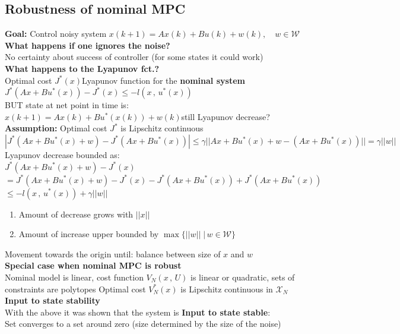 \subsection{Robustness of nominal MPC}
\textbf{Goal:} Control noisy system
$x(k+1)=Ax(k)+Bu(k)+w(k),\quad w\in\mathcal{W}$\\
\textbf{What happens if one ignores the noise?}\\
\rightarrow No certainty about success of controller (for some states it could work)\\
\textbf{What happens to the Lyapunov fct.?}\\
Optimal cost $J^*(x)$\rightarrow Lyapunov function for the \textbf{nominal system}\\
$J^*(Ax+Bu^*(x))-J^*(x)\leq-l(x\,,\,u^*(x))$\\
BUT state at net point in time is:\\
$x(k+1)=Ax(k)+Bu^*(x(k))+w(k)$\rightarrow still Lyapunov decrease?\\
\textbf{Assumption:} Optimal cost $J^*$ is Lipschitz continuous\\
$|J^*(Ax+Bu^*(x)+w)-J^*(Ax+Bu^*(x))|\leq\gamma||Ax+Bu^*(x)+w-(Ax+Bu^*(x))||=\gamma||w||$\\
Lyapunov decrease bounded as:\\
$J^*(Ax+Bu^*(x)+w)-J^*(x)$\\
$=J^*(Ax+Bu^*(x)+w)-J^*(x)-J^*(Ax+Bu^*(x))+J^*(Ax+Bu^*(x))$\\
$\leq-l(x\,,\,u^*(x))+\gamma||w||$
\begin{enumerate}
    \item Amount of decrease grows with $||x||$
    \item Amount of increase upper bounded by $\max\{||w||\;|\,w\in\mathcal{W}\}$
\end{enumerate}
\rightarrow Movement towards the origin until: balance between size of $x$ and $w$\\
\textbf{Special case when nominal MPC is robust}\\
Nominal model is linear, cost function $V_N(x\,,\,U)$ is linear or quadratic, sets of constraints are polytopes
\rightarrow Optimal cost $V_N^*(x)$ is Lipschitz continuous in $\mathcal{X}_N$\\
\textbf{Input to state stability}\\
\rightarrow With the above it was shown that the system is \textbf{Input to state stable}: \\Set converges to a set around zero (size determined by the size of the noise)\\
